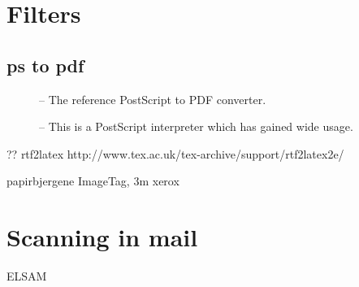 \section{Filters}
\label{sec:cactus-filters}


\subsection{ps to pdf}
\label{sec:filter-ps-to-pdf}

\begin{description}
\item[] -- The reference PostScript to PDF
  converter.
  
\item[] --
  This is a PostScript interpreter which has gained wide
  usage.
\end{description}

\textsf{??} rtf2latex
http://www.tex.ac.uk/tex-archive/support/rtf2latex2e/


papirbjergene ImageTag, 3m xerox

\section{Scanning in mail}

\textsf{ELSAM}




